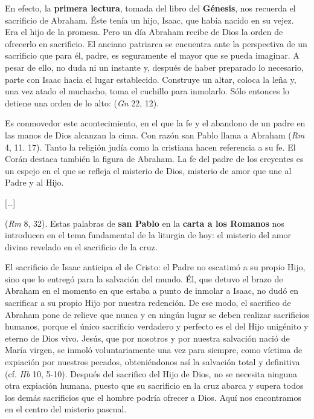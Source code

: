\begin{body}
En efecto, la \textbf{primera lectura}, tomada del libro del \textbf{Génesis}, nos recuerda el sacrificio de Abraham. Éste tenía un hijo, Isaac, que había nacido en su vejez. Era el hijo de la promesa. Pero un día Abraham recibe de Dios la orden de ofrecerlo en sacrificio. El anciano patriarca se encuentra ante la perspectiva de un sacrificio que para él, padre, es seguramente el mayor que se pueda imaginar. A pesar de ello, no duda ni un instante y, después de haber preparado lo necesario, parte con Isaac hacia el lugar establecido. Construye un altar, coloca la leña y, una vez atado el muchacho, toma el cuchillo para inmolarlo. Sólo entonces lo detiene una orden de lo alto:  (\textit{Gn} 22, 12).

Es conmovedor este acontecimiento, en el que la fe y el abandono de un padre en las manos de Dios alcanzan la cima. Con razón san Pablo llama a Abraham  (\textit{Rm} 4, 11. 17). Tanto la religión judía como la cristiana hacen referencia a su fe. El Corán destaca también la figura de Abraham. La fe del padre de los creyentes es un espejo en el que se refleja el misterio de Dios, misterio de amor que une al Padre y al Hijo.

[\ldots]

 (\textit{Rm} 8, 32). Estas palabras de \textbf{san Pablo} en la \textbf{carta a los Romanos} nos introducen en el tema fundamental de la liturgia de hoy: el misterio del amor divino revelado en el sacrificio de la cruz.

El sacrificio de Isaac anticipa el de Cristo: el Padre no escatimó a su propio Hijo, sino que lo entregó para la salvación del mundo. Él, que detuvo el brazo de Abraham en el momento en que estaba a punto de inmolar a Isaac, no dudó en sacrificar a su propio Hijo por nuestra redención. De ese modo, el sacrifico de Abraham pone de relieve que nunca y en ningún lugar se deben realizar sacrificios humanos, porque el único sacrificio verdadero y perfecto es el del Hijo unigénito y eterno de Dios vivo. Jesús, que por nosotros y por nuestra salvación nació de María virgen, se inmoló voluntariamente una vez para siempre, como víctima de expiación por nuestros pecados, obteniéndonos así la salvación total y definitiva (cf. \textit{Hb} 10, 5-10). Después del sacrifico del Hijo de Dios, no se necesita ninguna otra expiación humana, puesto que su sacrificio en la cruz abarca y supera todos los demás sacrificios que el hombre podría ofrecer a Dios. Aquí nos encontramos en el centro del misterio pascual.


\end{body}
